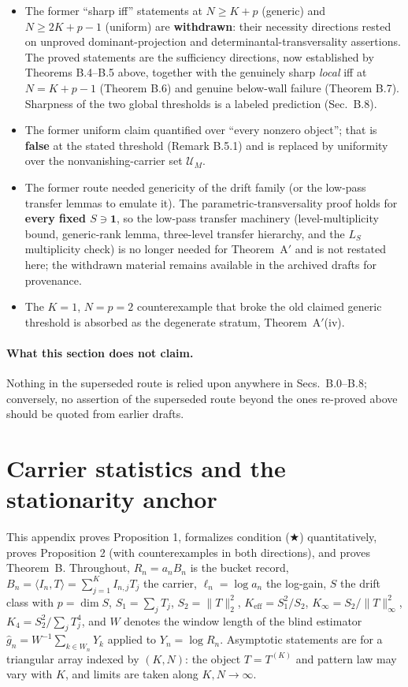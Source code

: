 \begin{itemize}
\item The former ``sharp iff'' statements at $N\ge K+p$ (generic) and $N\ge2K+p-1$ (uniform) are \textbf{withdrawn}: their necessity directions rested on unproved dominant-projection and determinantal-transversality assertions. The proved statements are the sufficiency directions, now established by Theorems B.4--B.5 above, together with the genuinely sharp \emph{local} iff at $N=K+p-1$ (Theorem B.6) and genuine below-wall failure (Theorem B.7). Sharpness of the two global thresholds is a labeled prediction (Sec.~B.8).
\item The former uniform claim quantified over ``every nonzero object''; that is \textbf{false} at the stated threshold (Remark B.5.1) and is replaced by uniformity over the nonvanishing-carrier set $\mathcal U_M$.
\item The former route needed genericity of the drift family (or the low-pass transfer lemmas to emulate it). The parametric-transversality proof holds for \textbf{every fixed $S\ni\mathbf 1$}, so the low-pass transfer machinery (level-multiplicity bound, generic-rank lemma, three-level transfer hierarchy, and the $L_S$ multiplicity check) is no longer needed for Theorem~A$'$ and is not restated here; the withdrawn material remains available in the archived drafts for provenance.
\item The $K=1$, $N=p=2$ counterexample that broke the old claimed generic threshold is absorbed as the degenerate stratum, Theorem~A$'$(iv).
\end{itemize}

\paragraph{What this section does not claim.} Nothing in the superseded route is relied upon anywhere in Secs.~B.0--B.8; conversely, no assertion of the superseded route beyond the ones re-proved above should be quoted from earlier drafts.

\section{Carrier statistics and the stationarity anchor}

This appendix proves Proposition 1, formalizes condition ($\bigstar$) quantitatively, proves Proposition 2 (with counterexamples in both directions), and proves Theorem~B. Throughout, $R_n = a_n B_n$ is the bucket record, $B_n = \langle I_n, T\rangle = \sum_{j=1}^K I_{n,j} T_j$ the carrier, $\ell_n = \log a_n$ the log-gain, $S$ the drift class with $p=\dim S$, $S_1=\sum_j T_j$, $S_2=\|T\|_2^2$, $K_{\mathrm{eff}}=S_1^2/S_2$, $K_\infty=S_2/\|T\|_\infty^2$, $K_4=S_2^2/\sum_j T_j^4$, and $W$ denotes the window length of the blind estimator $\hat g_n = W^{-1}\sum_{k\in W_n} Y_k$ applied to $Y_n=\log R_n$. Asymptotic statements are for a triangular array indexed by $(K,N)$: the object $T=T^{(K)}$ and pattern law may vary with $K$, and limits are taken along $K,N\to\infty$.

